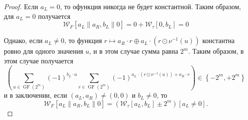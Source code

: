 \begin{proof}
Если $a_{L}=0$, то офункция никогда не будет константной. Таким образом, для $a_{L}=0$ получается
$$
\mathcal{W}_{F}\left[a_{L}\left\|a_{R}, b_{L}\right\| 0\right]=0+\mathcal{W}_{\tau}\left[0, b_{L}\right]=0
$$

Однако, если $a_{L} \neq 0$, то функция $r \mapsto a_{R} \cdot r \oplus a_{L} \cdot\left(r \odot \nu^{-1}(u)\right)$ константна ровно для одного значения $u$, и в этом случае сумма равна $2^{m}$. Таким образом, в этом случае получается
$$
\left(\sum_{u \in \operatorname{GF}\left(2^{m}\right)}(-1)^{b_{L} \cdot u} \sum_{r \in \operatorname{GF}\left(2^{m}\right)}(-1)^{a_{L} \cdot\left(r \odot \nu^{-1}(u)\right)+a_{R} \cdot r}\right) \in\left\{-2^{m},+2^{m}\right\}
$$
и в заключении, если $\left(a_{L}, a_{R}\right) \neq(0,0)$ и $b_{L} \neq 0$, то
$$
\mathcal{W}_{F}\left[a_{L}\left\|a_{R}, b_{L}\right\| 0\right]=\left(\mathcal{W}_{\tau}\left[a_{L}, b_{L}\right] \pm 2^{m}\right)\left[a_{L} \neq 0\right] .
$$

\end{proof}